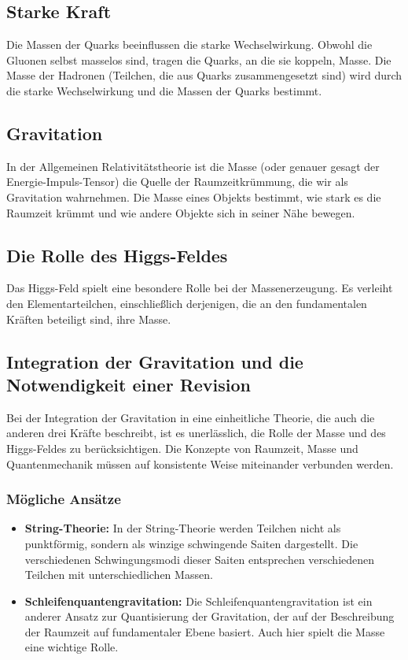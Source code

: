 \documentclass{article}
\begin{document}
\subsection{Starke Kraft}

Die Massen der Quarks beeinflussen die starke Wechselwirkung. Obwohl die Gluonen selbst masselos sind, tragen die Quarks, an die sie koppeln, Masse. Die Masse der Hadronen (Teilchen, die aus Quarks zusammengesetzt sind) wird durch die starke Wechselwirkung und die Massen der Quarks bestimmt.

\subsection{Gravitation}

In der Allgemeinen Relativitätstheorie ist die Masse (oder genauer gesagt der Energie-Impuls-Tensor) die Quelle der Raumzeitkrümmung, die wir als Gravitation wahrnehmen. Die Masse eines Objekts bestimmt, wie stark es die Raumzeit krümmt und wie andere Objekte sich in seiner Nähe bewegen.

\subsection{Die Rolle des Higgs-Feldes}

Das Higgs-Feld spielt eine besondere Rolle bei der Massenerzeugung. Es verleiht den Elementarteilchen, einschließlich derjenigen, die an den fundamentalen Kräften beteiligt sind, ihre Masse.

\subsection{Integration der Gravitation und die Notwendigkeit einer Revision}

Bei der Integration der Gravitation in eine einheitliche Theorie, die auch die anderen drei Kräfte beschreibt, ist es unerlässlich, die Rolle der Masse und des Higgs-Feldes zu berücksichtigen. Die Konzepte von Raumzeit, Masse und Quantenmechanik müssen auf konsistente Weise miteinander verbunden werden.

\subsubsection{Mögliche Ansätze}

\begin{itemize}
	\item \textbf{String-Theorie:} In der String-Theorie werden Teilchen nicht als punktförmig, sondern als winzige schwingende Saiten dargestellt. Die verschiedenen Schwingungsmodi dieser Saiten entsprechen verschiedenen Teilchen mit unterschiedlichen Massen.
	\item \textbf{Schleifenquantengravitation:} Die Schleifenquantengravitation ist ein anderer Ansatz zur Quantisierung der Gravitation, der auf der Beschreibung der Raumzeit auf fundamentaler Ebene basiert. Auch hier spielt die Masse eine wichtige Rolle.
\end{itemize}
\end{document}
